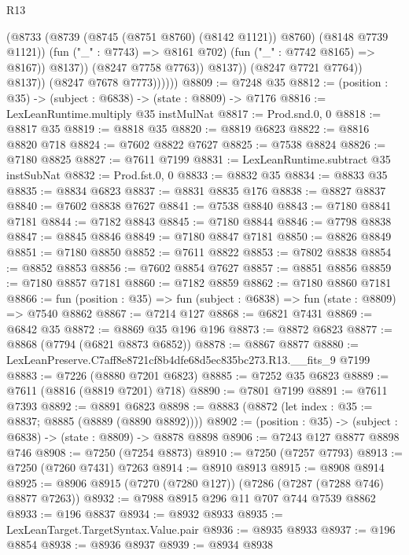 \begin{lexlean}{R13}
\begin{coremodule}
                                (@8733
                                  (@8739 (@8745 (@8751 @8760) (@8142 @1121)) @8760)
                                  (@8148 @7739 @1121))
                                (fun ("_" : @7743) => @8161 @702)
                                (fun ("_" : @7742 @8165) => @8167))
                              @8137))
                          (@8247 @7758 @7763))
                        @8137))
                    (@8247 @7721 @7764))
                  @8137))
              (@8247 @7678 @7773))))))
@8809 := @7248 @35
@8812 := (position : @35) -> (subject : @6838) -> (state : @8809) -> @7176
@8816 := LexLeanRuntime.multiply @35 instMulNat
@8817 := Prod.snd.{0, 0}
@8818 := @8817 @35
@8819 := @8818 @35
@8820 := @8819 @6823
@8822 := @8816 @8820 @718
@8824 := @7602 @8822 @7627
@8825 := @7538 @8824
@8826 := @7180 @8825
@8827 := @7611 @7199
@8831 := LexLeanRuntime.subtract @35 instSubNat
@8832 := Prod.fst.{0, 0}
@8833 := @8832 @35
@8834 := @8833 @35
@8835 := @8834 @6823
@8837 := @8831 @8835 @176
@8838 := @8827 @8837
@8840 := @7602 @8838 @7627
@8841 := @7538 @8840
@8843 := @7180 @8841 @7181
@8844 := @7182 @8843
@8845 := @7180 @8844
@8846 := @7798 @8838
@8847 := @8845 @8846
@8849 := @7180 @8847 @7181
@8850 := @8826 @8849
@8851 := @7180 @8850
@8852 := @7611 @8822
@8853 := @7802 @8838
@8854 := @8852 @8853
@8856 := @7602 @8854 @7627
@8857 := @8851 @8856
@8859 := @7180 @8857 @7181
@8860 := @7182 @8859
@8862 := @7180 @8860 @7181
@8866 := fun (position : @35) => fun (subject : @6838) => fun (state : @8809) => @7540 @8862
@8867 := @7214 @127
@8868 := @6821 @7431
@8869 := @6842 @35
@8872 := @8869 @35 @196 @196
@8873 := @8872 @6823
@8877 := @8868 (@7794 (@6821 @8873 @6852))
@8878 := @8867 @8877
@8880 := LexLeanPreserve.C7aff8e8721cf8b4dfe68d5ec835bc273.R13.__fits_9 @7199
@8883 := @7226 (@8880 @7201 @6823)
@8885 := @7252 @35 @6823
@8889 := @7611 (@8816 (@8819 @7201) @718)
@8890 := @7801 @7199
@8891 := @7611 @7393
@8892 := @8891 @6823
@8898 := @8883 (@8872 (let index : @35 := @8837; @8885 (@8889 (@8890 @8892))))
@8902 := (position : @35) -> (subject : @6838) -> (state : @8809) -> @8878 @8898
@8906 := @7243 @127 @8877 @8898 @746
@8908 := @7250 (@7254 @8873)
@8910 := @7250 (@7257 @7793)
@8913 := @7250 (@7260 @7431) @7263
@8914 := @8910 @8913
@8915 := @8908 @8914
@8925 := @8906 @8915 (@7270 (@7280 @127)) (@7286 (@7287 (@7288 @746) @8877 @7263))
@8932 := @7988 @8915 @296 @11 @707 @744 @7539 @8862
@8933 := @196 @8837
@8934 := @8932 @8933
@8935 := LexLeanTarget.TargetSyntax.Value.pair
@8936 := @8935 @8933
@8937 := @196 @8854
@8938 := @8936 @8937
@8939 := @8934 @8938

\end{coremodule}
\end{lexlean}
